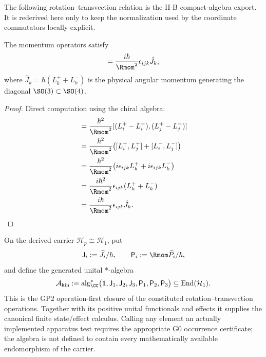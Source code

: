 \documentclass[12pt,a4paper]{article}
\begin{document}
The following rotation--transvection relation is the II-B compact-algebra
export.  It is rederived here only to keep the normalization used by the
coordinate commutators locally explicit.

\begin{proposition}
\label{p2:prop:momentum-commutation-relations}
The momentum operators satisfy
\begin{equation}
[\hat{P}_i, \hat{P}_j] = \frac{i\hbar}{\Rmom^2}\epsilon_{ijk}\hat{J}_k,
\end{equation}
where \(\hat{J}_k=\hbar(L^+_k+L^-_k)\) is the physical angular momentum generating the diagonal \(\SO(3)\subset\SO(4)\).
\end{proposition}

\begin{proof}
Direct computation using the chiral algebra:
\begin{align}
[\hat{P}_i, \hat{P}_j] &= \frac{\hbar^2}{\Rmom^2}[(L^+_i - L^-_i), (L^+_j - L^-_j)] \\
&= \frac{\hbar^2}{\Rmom^2}\bigl([L^+_i, L^+_j] + [L^-_i, L^-_j]\bigr) \\
&= \frac{\hbar^2}{\Rmom^2}\bigl(i\epsilon_{ijk}L^+_k + i\epsilon_{ijk}L^-_k\bigr) \\
&= \frac{i\hbar^2}{\Rmom^2}\epsilon_{ijk}(L^+_k + L^-_k) \\
&= \frac{i\hbar}{\Rmom^2}\epsilon_{ijk}\hat{J}_k.
\end{align}
\end{proof}

\begin{definition}
\label{p2c:def:generated-kinematic-test-algebra}
On the derived carrier \(\mathcal H_p\cong\mathcal H_1\), put
\[
 \mathsf J_i:=\widehat J_i/\hbar,
 \qquad
 \mathsf P_i:=\Rmom\widehat P_i/\hbar,
\]
and define the generated unital \(*\)-algebra
\[
 \mathcal A_{\rm kin}
 :=\operatorname{alg}_{\CC}^{*}
 \bigl(\mathbf1,\mathsf J_1,\mathsf J_2,\mathsf J_3,
              \mathsf P_1,\mathsf P_2,\mathsf P_3\bigr)
 \subseteq\operatorname{End}(\mathcal H_1).
\]
This is the GP2 operation-first closure of the constituted
rotation--transvection operations.  Together with its positive unital
functionals and effects it supplies the canonical finite state/effect
calculus.  Calling any element an actually implemented apparatus test requires
the appropriate G0 occurrence certificate; the algebra is not defined to
contain every mathematically available endomorphism of the carrier.
\end{definition}
\end{document}
